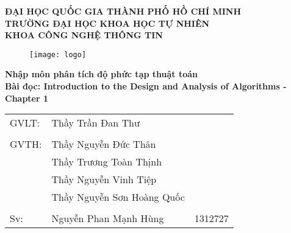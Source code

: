 \begin{titlepage}
\begin{center}
	\large{\textbf{ĐẠI HỌC QUỐC GIA THÀNH PHỐ HỒ CHÍ MINH}}\\
	\large{\textbf{TRƯỜNG ĐẠI HỌC KHOA HỌC TỰ NHIÊN}}\\
	\large{\textbf{KHOA CÔNG NGHỆ THÔNG TIN}}\\
	
	\begin{figure}[H]
		\centerline{\texttt{[image: logo]}}
	\end{figure}

	\Large{\textbf{Nhập môn phân tích độ phức tạp thuật toán}}\\
	\Large{\textbf{Bài đọc: Introduction to the Design and Analysis of Algorithms - Chapter 1}}\\

\end{center}
	\vfill
\begin{flushright}
	
	\begin{tabular}{l l l}
		GVLT: &Thầy Trần Đan Thư\\
		&\\
		GVTH: &Thầy Nguyễn Đức Thân\\
		&Thầy Trương Toàn Thịnh\\
		&Thầy Nguyễn Vinh Tiệp\\
		&Thầy Nguyễn Sơn Hoàng Quốc\\
		&\\
		Sv: &Nguyễn Phan Mạnh Hùng & 1312727\\
	\end{tabular}
\end{flushright}

\vfill
\end{titlepage}
